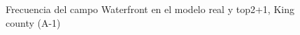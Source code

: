 \begin{figure}[H]
    \centering
    
    \caption{Frecuencia del campo Waterfront en el modelo real y top2+1, King county (A-1)}
    \label{frecuency-top2+1-waterfront}
\end{figure}